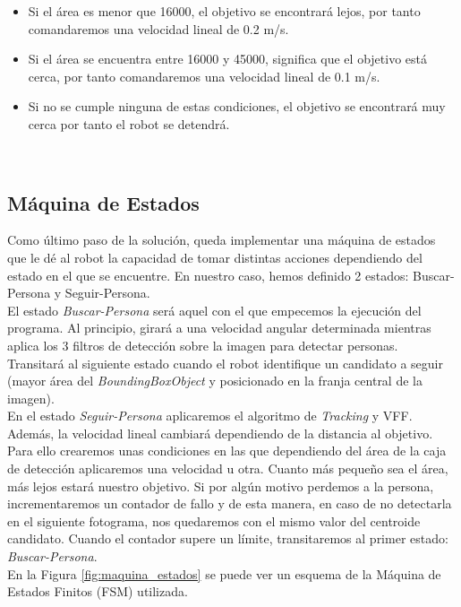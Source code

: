 \begin{itemize}
	\item Si el área es menor que 16000, el objetivo se encontrará lejos, por tanto comandaremos una velocidad lineal de 0.2 m/s.
	\item Si el área se encuentra entre 16000 y 45000, significa que el objetivo está cerca, por tanto comandaremos una velocidad lineal de 0.1 m/s.
	\item Si no se cumple ninguna de estas condiciones, el objetivo se encontrará muy cerca por tanto el robot se detendrá.
\end{itemize}\


\subsection{Máquina de Estados}
\label{subsec:maquina_estados}

Como último paso de la solución, queda implementar una máquina de estados que le dé al robot la capacidad de tomar distintas acciones dependiendo del estado en el que se encuentre. En nuestro caso, hemos definido 2 estados: Buscar-Persona y Seguir-Persona.\\

El estado \textit{Buscar-Persona} será aquel con el que empecemos la ejecución del programa. Al principio, girará a una velocidad angular determinada mientras aplica los 3 filtros de detección sobre la imagen para detectar personas. Transitará al siguiente estado cuando el robot identifique un candidato a seguir (mayor área del \textit{BoundingBoxObject} y posicionado en la franja central de la imagen).\\

En el estado \textit{Seguir-Persona} aplicaremos el algoritmo de \textit{Tracking} y VFF. Además, la velocidad lineal cambiará dependiendo de la distancia al objetivo. Para ello crearemos unas condiciones en las que dependiendo del área de la caja de detección aplicaremos una velocidad u otra. Cuanto más pequeño sea el área, más lejos estará nuestro objetivo. Si por algún motivo perdemos a la persona, incrementaremos un contador de fallo y de esta manera, en caso de no detectarla en el siguiente fotograma, nos quedaremos con el mismo valor del centroide candidato. Cuando el contador supere un límite, transitaremos al primer estado: \textit{Buscar-Persona}.\\

En la Figura \ref{fig:maquina_estados} se puede ver un esquema de la Máquina de Estados Finitos (FSM) utilizada.\\

